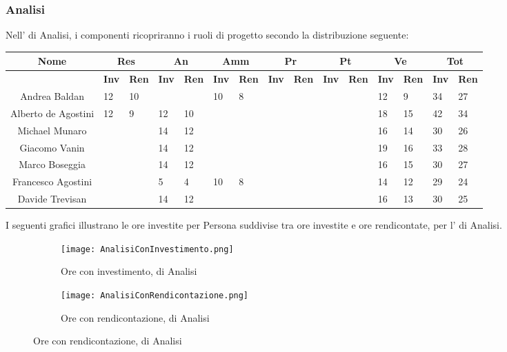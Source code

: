 \documentclass{scalatekids-article}
\begin{document}
\subsubsection{Analisi}
Nell' di Analisi, i componenti ricopriranno i ruoli di progetto secondo la distribuzione seguente:
\begin{center}
  \scriptsize
  \begin{tabular}{| c | p{0.35cm} p{0.35cm} | p{0.35cm} p{0.35cm} | p{0.35cm} p{0.35cm} | p{0.35cm} p{0.35cm} | p{0.35cm} p{0.35cm} | p{0.35cm} p{0.35cm} | p{0.35cm} p{0.35cm} |}
    \hline
    \textbf{Nome} & \multicolumn{2}{|c|}{\textbf{Res}} & \multicolumn{2}{|c|}{\textbf{An}} & \multicolumn{2}{|c|}{\textbf{Amm}} & \multicolumn{2}{|c|}{\textbf{Pr}} & \multicolumn{2}{|c|}{\textbf{Pt}} & \multicolumn{2}{|c|}{\textbf{Ve}} & \multicolumn{2}{|c|}{\textbf{Tot}}\\
    \hline
    & \textbf{Inv} & \textbf{Ren} & \textbf{Inv} & \textbf{Ren} & \textbf{Inv} & \textbf{Ren} & \textbf{Inv} & \textbf{Ren} & \textbf{Inv} & \textbf{Ren} & \textbf{Inv} & \textbf{Ren} & \textbf{Inv} & \textbf{Ren}\\
    \hline
    Andrea Baldan & 12 & 10 & & & 10 & 8 & & & & & 12 & 9 & 34 & 27\\
    Alberto de Agostini & 12 & 9 & 12 & 10 & & & & & & & 18 & 15 & 42 & 34\\
    Michael Munaro & & & 14 & 12 & & & & & & & 16 & 14 & 30 & 26\\
    Giacomo Vanin & & & 14 & 12 & & & & & & & 19 & 16 & 33 & 28\\
    Marco Boseggia & & & 14 & 12 & & & & & & & 16 & 15 & 30 & 27\\
    Francesco Agostini & & & 5 & 4 & 10 & 8 & & & & & 14 & 12 & 29 & 24\\
    Davide Trevisan & & & 14 & 12 & & & & & & & 16 & 13 & 30 & 25\\
    \hline
  \end{tabular}
\end{center}
I seguenti grafici illustrano le ore investite per Persona suddivise tra ore investite e ore rendicontate, per l' di Analisi.
\begin{figure}[H]
  \begin{subfigure}[H]{0.47\textwidth}
    \texttt{[image: AnalisiConInvestimento.png]}
    \caption{Ore con investimento,  di Analisi}
  \end{subfigure}
  \qquad
  \begin{subfigure}[H]{0.47\textwidth}
    \texttt{[image: AnalisiConRendicontazione.png]}
    \caption{Ore con rendicontazione,  di Analisi}
  \end{subfigure}
\end{figure}
\end{document}
